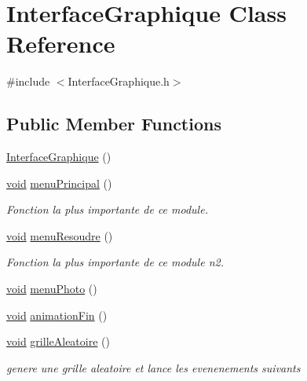 \hypertarget{class_interface_graphique}{}\section{Interface\+Graphique Class Reference}
\label{class_interface_graphique}


{\ttfamily \#include $<$Interface\+Graphique.\+h$>$}

\subsection*{Public Member Functions}
\begin{DoxyCompactItemize}
\item 
\hyperlink{class_interface_graphique_a49ac7d565febf28e8f4361ec85243922}{Interface\+Graphique} ()
\item 
\hyperlink{_s_d_l__opengl_8h_a3db05964a3cc4410f35b7ea2b7eb850d}{void} \hyperlink{class_interface_graphique_a8a685b936029adba2fcc1f1b268af491}{menu\+Principal} ()
\begin{DoxyCompactList}\small\item\em Fonction la plus importante de ce module. \end{DoxyCompactList}\item 
\hyperlink{_s_d_l__opengl_8h_a3db05964a3cc4410f35b7ea2b7eb850d}{void} \hyperlink{class_interface_graphique_ac9dbfc1f5852c8d56fcbfbefe8855117}{menu\+Resoudre} ()
\begin{DoxyCompactList}\small\item\em Fonction la plus importante de ce module n2. \end{DoxyCompactList}\item 
\hyperlink{_s_d_l__opengl_8h_a3db05964a3cc4410f35b7ea2b7eb850d}{void} \hyperlink{class_interface_graphique_a60cf21e7a0a9704f847749662ff772f8}{menu\+Photo} ()
\item 
\hyperlink{_s_d_l__opengl_8h_a3db05964a3cc4410f35b7ea2b7eb850d}{void} \hyperlink{class_interface_graphique_aca846be72df3bd1966c286477a942484}{animation\+Fin} ()
\item 
\hyperlink{_s_d_l__opengl_8h_a3db05964a3cc4410f35b7ea2b7eb850d}{void} \hyperlink{class_interface_graphique_af514174206b8714d34407f5dea89f084}{grille\+Aleatoire} ()
\begin{DoxyCompactList}\small\item\em genere une grille aleatoire et lance les evenenements suivants \end{DoxyCompactList}\item 

\end{DoxyCompactItemize}
